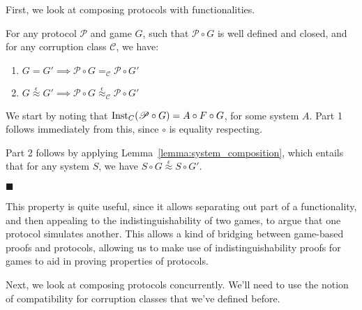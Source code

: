 First, we look at composing protocols with functionalities.

\begin{theorem}
  \label{thm:vertical_composition_theorem}
  For any protocol $\mathscr{P}$ and game $G$, such that $\mathscr{P} \circ G$
  is well defined and closed, and for any corruption class $\mathscr{C}$, we have:
  \begin{enumerate}
    \item $G = G' \implies \mathscr{P} \circ G =_{\mathscr{C}} \mathscr{P} \circ G'$
    \item $G \overset{\epsilon}{\approx} G' \implies \mathscr{P} \circ G \overset{\epsilon}{\approx}_{\mathscr{C}} \mathscr{P} \circ G'$
  \end{enumerate}
  
 We start by noting that $\text{Inst}_C(\mathscr{P} \circ G) = A \circ F \circ G$,
for some system $A$.
Part 1 follows immediately from this, since $\circ$ is equality respecting.

Part 2 follows by applying Lemma~\ref{lemma:system_composition},
which entails that for any system $S$, we have $S \circ G \overset{\epsilon}{\approx} S \circ G'$.

$\blacksquare$
\end{theorem}

This property is quite useful, since it allows separating out part
of a functionality, and then appealing to the indistinguishability
of two games, to argue that one protocol simulates another.
This allows a kind of bridging between game-based proofs
and protocols, allowing us to make
use of indistinguishability proofs for games to aid
in proving properties of protocols.

Next, we look at composing protocols concurrently.
We'll need to use the notion of compatibility for corruption
classes that we've defined before.

